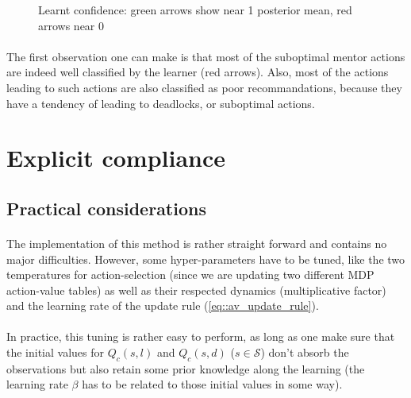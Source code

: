 \documentclass[a4paper]{report}
\begin{document}
{{{{\begin{figure}[ht!]
\begin{minipage}{0.5\linewidth}
\begin{center}
							\caption{Learnt confidence: green arrows show near 1 posterior mean, red arrows near 0}
							\label{fig::heatmap_confidence_50}
						\end{center}
					\end{minipage}
				\end{figure}
				
				\paragraph{} The first observation one can make is that most of the suboptimal mentor actions are indeed well classified by the learner (red arrows). Also, most of the actions leading to such actions are also classified as poor recommandations, because they have a tendency of leading to deadlocks, or suboptimal actions.  
			}
		}
		\section{Explicit compliance}
		{
		
			\subsection{Practical considerations}
			{
				\paragraph{} The implementation of this method is rather straight forward and contains no major difficulties. However, some hyper-parameters have to be tuned, like the two temperatures for action-selection (since we are updating two different MDP action-value tables) as well as their respected  dynamics (multiplicative factor) and the learning rate of the update rule (\ref{eq::av_update_rule}). 
				
				\paragraph{} In practice, this tuning is rather easy to perform, as long as one make sure that the initial values for $Q_c(s,l)$ and $Q_c(s,d)$ ($s\in\mathcal{S}$) don't absorb the observations but also retain some prior knowledge along the learning (the learning rate $\beta$ has to be related to those initial values in some way). 
			}
}}}
\end{document}
